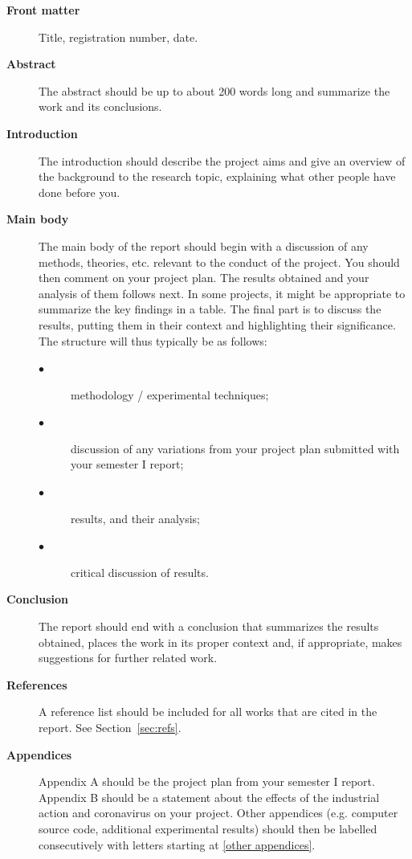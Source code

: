 \documentclass[a4paper,fleqn,usenatbib]{mnras}
\begin{document}
\begin{description}
\item[\textbf{Front matter}]	Title, registration number, date.

\item[\textbf{Abstract}]	The abstract should be up to about 200 words long and summarize the work and its conclusions. 

\item[\textbf{Introduction}]	The introduction should describe the project aims and give an overview of the background to the research topic, explaining what other people have done before you. 

\item[\textbf{Main body}] The main body of the report should begin with a discussion of any methods, theories, etc. relevant to the conduct of the project. You should then comment on your project plan. The results obtained and your analysis of them follows next. In some projects, it might be appropriate to summarize the key findings in a table. The final part is to discuss the results, putting them in their context and highlighting their significance. The structure will thus typically be as follows:
\begin{description}
\item[$\bullet$] methodology / experimental techniques;
\item[$\bullet$] discussion of any variations from your project plan submitted with your semester I report;
\item[$\bullet$] results, and their analysis;
\item[$\bullet$] critical discussion of results.
\end{description}

\item[\textbf{Conclusion}]	The report should end with a conclusion that summarizes the results obtained, places the work in its proper context and, if appropriate, makes suggestions for further related work. 

\item[\textbf{References}]	A reference list should be included for all works that are cited in the report. See Section~\ref{sec:refs}.

\item[\textbf{Appendices}]	Appendix A should be the project plan from your semester I report. Appendix B should be a statement about the effects of the industrial action and coronavirus on your project. Other appendices (e.g. computer source code, additional experimental results) should then be labelled consecutively with letters starting at \ref{other appendices}. 
\end{description}
\end{document}
